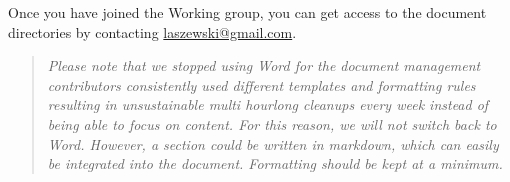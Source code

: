 Once you have joined the Working group, you can get access to the
document directories by contacting \url{laszewski@gmail.com}.

\begin{quote}

{\em Please note that we stopped using Word for the document
  management contributors consistently used different templates and
  formatting rules resulting in unsustainable multi hourlong cleanups
  every week instead of being able to focus on content. For this
  reason, we will not switch back to Word. However, a section could be
  written in markdown, which can easily be integrated into the
  document. Formatting should be kept at a minimum.}

\end{quote}
